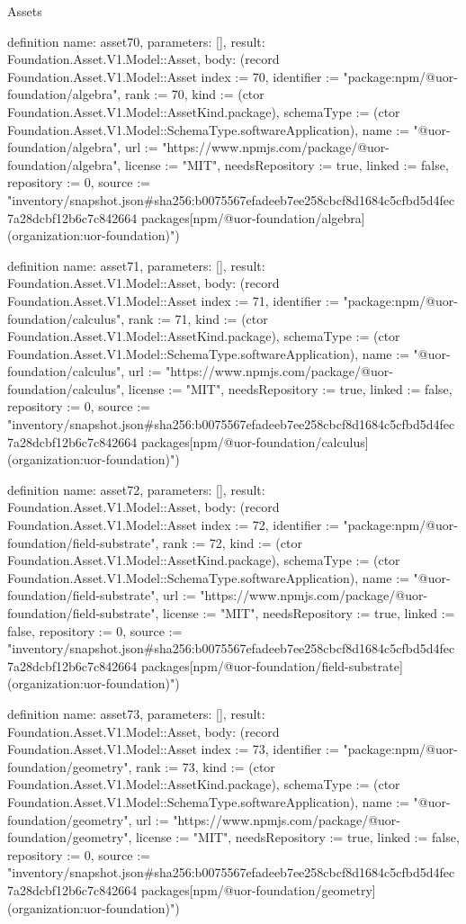 \begin{lexlean}{Assets}
\begin{semanticmodule}
definition{
  name: asset70,
  parameters: [],
  result: Foundation.Asset.V1.Model::Asset,
  body: (record Foundation.Asset.V1.Model::Asset {index := 70, identifier := "package:npm/@uor-foundation/algebra", rank := 70, kind := (ctor Foundation.Asset.V1.Model::AssetKind.package), schemaType := (ctor Foundation.Asset.V1.Model::SchemaType.softwareApplication), name := "@uor-foundation/algebra", url := "https://www.npmjs.com/package/@uor-foundation/algebra", license := "MIT", needsRepository := true, linked := false, repository := 0, source := "inventory/snapshot.json#sha256:b0075567efadeeb7ee258cbcf8d1684c5cfbd5d4fec7a28dcbf12b6c7c842664 packages[npm/@uor-foundation/algebra] (organization:uor-foundation)"})
}

definition{
  name: asset71,
  parameters: [],
  result: Foundation.Asset.V1.Model::Asset,
  body: (record Foundation.Asset.V1.Model::Asset {index := 71, identifier := "package:npm/@uor-foundation/calculus", rank := 71, kind := (ctor Foundation.Asset.V1.Model::AssetKind.package), schemaType := (ctor Foundation.Asset.V1.Model::SchemaType.softwareApplication), name := "@uor-foundation/calculus", url := "https://www.npmjs.com/package/@uor-foundation/calculus", license := "MIT", needsRepository := true, linked := false, repository := 0, source := "inventory/snapshot.json#sha256:b0075567efadeeb7ee258cbcf8d1684c5cfbd5d4fec7a28dcbf12b6c7c842664 packages[npm/@uor-foundation/calculus] (organization:uor-foundation)"})
}

definition{
  name: asset72,
  parameters: [],
  result: Foundation.Asset.V1.Model::Asset,
  body: (record Foundation.Asset.V1.Model::Asset {index := 72, identifier := "package:npm/@uor-foundation/field-substrate", rank := 72, kind := (ctor Foundation.Asset.V1.Model::AssetKind.package), schemaType := (ctor Foundation.Asset.V1.Model::SchemaType.softwareApplication), name := "@uor-foundation/field-substrate", url := "https://www.npmjs.com/package/@uor-foundation/field-substrate", license := "MIT", needsRepository := true, linked := false, repository := 0, source := "inventory/snapshot.json#sha256:b0075567efadeeb7ee258cbcf8d1684c5cfbd5d4fec7a28dcbf12b6c7c842664 packages[npm/@uor-foundation/field-substrate] (organization:uor-foundation)"})
}

definition{
  name: asset73,
  parameters: [],
  result: Foundation.Asset.V1.Model::Asset,
  body: (record Foundation.Asset.V1.Model::Asset {index := 73, identifier := "package:npm/@uor-foundation/geometry", rank := 73, kind := (ctor Foundation.Asset.V1.Model::AssetKind.package), schemaType := (ctor Foundation.Asset.V1.Model::SchemaType.softwareApplication), name := "@uor-foundation/geometry", url := "https://www.npmjs.com/package/@uor-foundation/geometry", license := "MIT", needsRepository := true, linked := false, repository := 0, source := "inventory/snapshot.json#sha256:b0075567efadeeb7ee258cbcf8d1684c5cfbd5d4fec7a28dcbf12b6c7c842664 packages[npm/@uor-foundation/geometry] (organization:uor-foundation)"})
}


\end{semanticmodule}
\end{lexlean}
